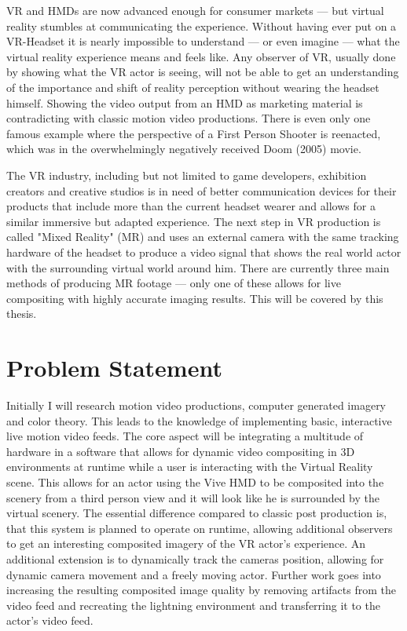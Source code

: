 VR and HMDs are now advanced enough for consumer markets --- but virtual 
reality stumbles at communicating the experience. Without having ever put on a 
VR-Headset it is nearly impossible to understand --- or even imagine --- what 
the virtual reality experience means and feels like. Any observer of VR, 
usually done by showing what the VR actor is seeing, will not be able to get an 
understanding of the importance and shift of reality perception without wearing 
the headset himself.
\newline
Showing the video output from an HMD as marketing material is contradicting 
with classic motion video productions. There is even only one famous example 
where the perspective of a First Person Shooter is reenacted, which was in the 
overwhelmingly negatively received Doom (2005) movie.

The VR industry, including but not limited to game developers, exhibition 
creators and creative studios is in need of better communication devices for 
their products that include more than the current headset wearer and allows 
for a similar immersive but adapted experience.
\newline
The next step in VR production is called "Mixed Reality" (MR) and uses an 
external camera with the same tracking hardware of the headset to produce a 
video signal that shows the real world actor with the surrounding virtual world 
around him. There are currently three main methods of producing MR footage --- 
only one of these allows for live compositing with highly accurate imaging 
results. This will be covered by this thesis.

\section{Problem Statement}
\label{sec:intro:problem}

Initially I will research motion video productions, computer generated imagery 
and color theory. This leads to the knowledge of implementing basic, 
interactive live motion video feeds.
\newline
The core aspect will be integrating a multitude of hardware in a software that 
allows for dynamic video compositing in 3D environments at runtime while a user 
is interacting with the Virtual Reality scene. This allows for an actor using 
the Vive HMD to be composited into the scenery from a third person view 
and it will look like he is surrounded by the virtual scenery. The essential 
difference compared to classic post production is, that this system is planned 
to operate on runtime, allowing additional observers to get an interesting 
composited imagery of the VR actor's experience.
\newline
An additional extension is to dynamically track the cameras position, allowing 
for dynamic camera movement and a freely moving actor. Further work goes into 
increasing the resulting composited image quality by removing artifacts from 
the video feed and recreating the lightning environment and transferring it to 
the actor's video feed. 


